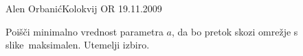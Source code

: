 \begin{naloga}{Alen Orbanić}{Kolokvij OR 19.11.2009}
\begin{vprasanje}
Poišči minimalno vrednost parametra $a$,
da bo pretok skozi omrežje s slike~\fig maksimalen.
Utemelji izbiro.

\begin{slika}
\pgfslika
{}
\end{slika}
\end{vprasanje}
\begin{odgovor}
\end{odgovor}
\end{naloga}
